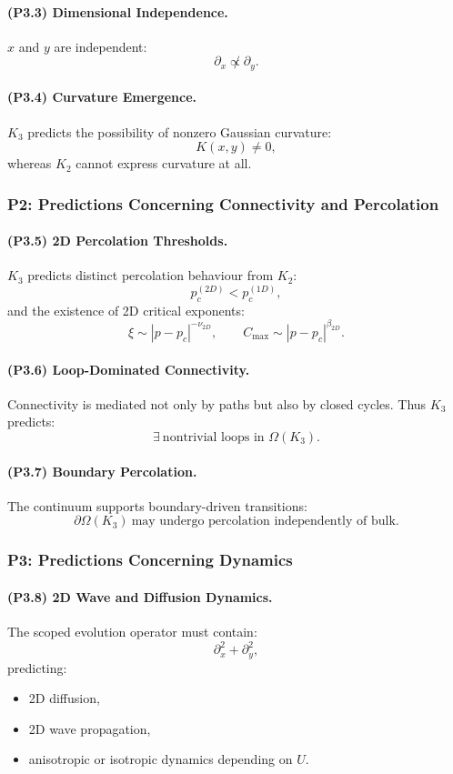 \paragraph{(P3.3) Dimensional Independence.}
$x$ and $y$ are independent:
\[
\partial_x \not\propto \partial_y.
\]

\paragraph{(P3.4) Curvature Emergence.}
$K_3$ predicts the possibility of nonzero Gaussian curvature:
\[
K(x,y) \neq 0,
\]
whereas $K_2$ cannot express curvature at all.

\subsubsection{P2: Predictions Concerning Connectivity and Percolation}

\paragraph{(P3.5) 2D Percolation Thresholds.}
$K_3$ predicts distinct percolation behaviour from $K_2$:
\[
p_c^{(2D)} < p_c^{(1D)},
\]
and the existence of 2D critical exponents:
\[
\xi \sim |p - p_c|^{-\nu_{2D}},
\qquad
C_{\max} \sim |p - p_c|^{\beta_{2D}}.
\]

\paragraph{(P3.6) Loop-Dominated Connectivity.}
Connectivity is mediated not only by paths but also by closed cycles.
Thus $K_3$ predicts:
\[
\exists \ \text{nontrivial loops in } \Omega(K_3).
\]

\paragraph{(P3.7) Boundary Percolation.}
The continuum supports boundary-driven transitions:
\[
\partial\Omega(K_3) \ \text{may undergo percolation independently of bulk}.
\]

\subsubsection{P3: Predictions Concerning Dynamics}

\paragraph{(P3.8) 2D Wave and Diffusion Dynamics.}
The scoped evolution operator must contain:
\[
\partial_x^2 + \partial_y^2,
\]
predicting:
\begin{itemize}
    \item 2D diffusion,
    \item 2D wave propagation,
    \item anisotropic or isotropic dynamics depending on $U$.
\end{itemize}

